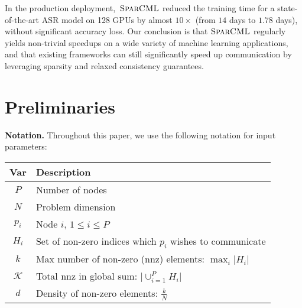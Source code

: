 \documentclass[11pt]{article}
\renewcommand{\paragraph}[1]{\vspace{0.1em} \noindent \textbf{#1}}
\newcommand{\mml}{$\textsc{SparCML}$}
\begin{document}
In the production deployment,~\mml{} reduced the training time for a state-of-the-art ASR model on 128 GPUs by almost $10\times$ (from $14$ days to $1.78$ days), without significant accuracy loss.  
Our conclusion is that \mml{} regularly yields non-trivial speedups on a wide variety of machine learning applications, and that existing frameworks can still significantly speed up communication by leveraging sparsity and relaxed consistency guarantees.  


\section{Preliminaries}
\label{sec:prelim}


\paragraph{Notation.} Throughout this paper, we use the following notation for input parameters:
\begin{center}
	\begin{tabular}{ @{} c | l @{} }
		\toprule
		Var & Description \\
		\midrule 
		$P$ & Number of nodes \\
		$N$ & Problem dimension \\
		$p_i$ & Node $i$, $1 \leq i \leq P$ \\
		$H_i$ & Set of non-zero indices which $p_i$ wishes to communicate \\
		$k$ & Max number of non-zero (nnz) elements: $\max_i \vert H_i \vert$ \\
		$\mathcal{K}$ &  Total nnz in global sum: $\vert \cup_{i=1}^{P} H_i \vert$ \\
		$d$ & Density of non-zero elements: $\frac{k}{N}$ \\
		\bottomrule
	\end{tabular}
\end{center}
\end{document}
